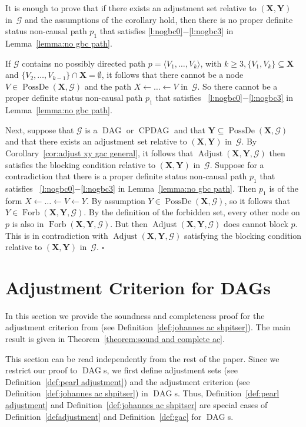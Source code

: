 \documentclass[11pt,a4paper]{article}
\newenvironment{proofof}[1][]{\begin{trivlist}
   \item[\hskip \labelsep {\bfseries Proof of #1.}]}{\hfill{}$\square$\end{trivlist}}
\DeclareMathOperator{\CPDAG}{CPDAG}
\DeclareMathOperator{\DAG}{DAG}
\DeclareMathOperator{\PossDe}{PossDe}
\DeclareMathOperator{\Adjust}{Adjust}
\DeclareMathOperator{\Forbi}{Forb}
\newcommand{\blck}{the blocking condition\xspace}
\newcommand{\g}[1][G]{\mathcal{#1}}
\newcommand{\adjustb}[2][X,Y]{\Adjust(\mathbf{#1},#2)}
\newcommand{\fb}[2][X,Y]{\Forbi(\mathbf{#1},#2)}%
\begin{document}
\begin{proofof}[Corollary~\ref{cor:equivalence gac gbc}]
It is enough to prove that if there exists an adjustment set relative to $(\mathbf{X,Y})$ in~$\g$ and the assumptions of the corollary hold, then there is no proper definite status non-causal path $p_1$ that satisfies \ref{l:nogbc0}$-$\ref{l:nogbc3} in Lemma~\ref{lemma:no gbc path}.

If $\g$ contains no possibly directed path $p = \langle V_1, \dots ,V_k \rangle$, with $k \ge 3, \{V_{1},V_{k}\} \subseteq \mathbf{X}$ and $\{V_{2}, \dots ,V_{k-1}\} \cap \mathbf{X} = \emptyset$, it follows that there cannot be a node $V \in \PossDe(\mathbf{X},\g)$ and the path $X \leftarrow \dots \leftarrow V$ in~$\g$. So there cannot be a proper definite status non-causal path $p_1$ that satisfies ~\ref{l:nogbc0}$-$\ref{l:nogbc3} in Lemma~\ref{lemma:no gbc path}.

Next, suppose that $\g$ is a $\DAG$ or $\CPDAG$ and that $\mathbf{Y} \subseteq \PossDe(\mathbf{X},\g)$ and that there exists an adjustment set relative to $(\mathbf{X,Y})$ in~$\g$. By Corollary~\ref{cor:adjust xy gac general}, it follows that $\adjustb{\g}$ then satisfies \blck{} relative to $(\mathbf{X,Y})$ in~$\g$.
Suppose for a contradiction that there is a proper definite status non-causal path $p_1$ that satisfies ~\ref{l:nogbc0}$-$\ref{l:nogbc3} in Lemma~\ref{lemma:no gbc path}. Then $p_1$ is of the form $ X \leftarrow \dots \leftarrow V \leftarrow Y$. By assumption $Y \in \PossDe(\mathbf{X},\g)$, so it follows that $Y \in \fb{\g}$. By the definition of the forbidden set, every other node on $p$ is also in $\fb{\g}$. But then $\adjustb{\g}$ does cannot block $p$. This is in contradiction with $\adjustb{\g}$ satisfying \blck{} relative to $(\mathbf{X,Y})$ in~$\g$.
\end{proofof}


\section{Adjustment Criterion for DAGs} \label{subsec:proofs shpitser}


In this section we provide the soundness and completeness proof for the adjustment criterion from \cite{shpitser2012avalidity,vanconstructing} (see Definition~\ref{def:johannes ac shpitser}). The main result is given in Theorem~\ref{theorem:sound and complete ac}.

This section can be read independently from the rest of the paper. Since we restrict our proof to $\DAG$s, we first define adjustment sets (see Definition~\ref{def:pearl adjustment}) and the adjustment criterion (see Definition~\ref{def:johannes ac shpitser}) in $\DAG$s. Thus, Definition~\ref{def:pearl adjustment} and Definition~\ref{def:johannes ac shpitser} are special cases of Definition~\ref{defadjustment} and Definition~\ref{def:gac} for $\DAG$s.
\end{document}
